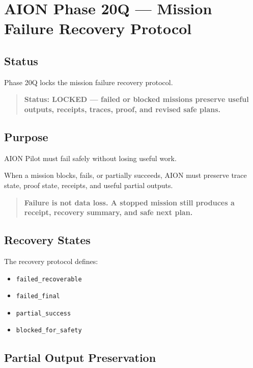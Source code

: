\section{AION Phase 20Q --- Mission Failure Recovery Protocol}
\label{sec:aion-phase20q-mission-failure-recovery}

\subsection{Status}

Phase 20Q locks the mission failure recovery protocol.

\begin{quote}
\textbf{Status: LOCKED --- failed or blocked missions preserve useful outputs, receipts, traces, proof, and revised safe plans.}
\end{quote}

\subsection{Purpose}

AION Pilot must fail safely without losing useful work.

When a mission blocks, fails, or partially succeeds, AION must preserve trace state, proof state, receipts, and useful partial outputs.

\begin{quote}
\textbf{Failure is not data loss. A stopped mission still produces a receipt, recovery summary, and safe next plan.}
\end{quote}

\subsection{Recovery States}

The recovery protocol defines:

\begin{itemize}
  \item \texttt{failed\_recoverable}
  \item \texttt{failed\_final}
  \item \texttt{partial\_success}
  \item \texttt{blocked\_for\_safety}
\end{itemize}

\subsection{Partial Output Preservation}

